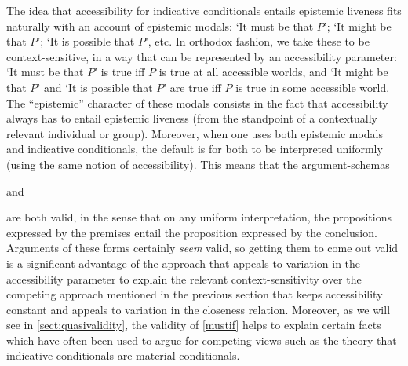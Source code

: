 \documentclass[If.tex]{subfiles}
\begin{document}
The idea that accessibility for indicative conditionals entails epistemic liveness fits naturally with an account of epistemic modals: ‘It must be that $P$’; ‘It might be that $P$’; ‘It is possible that $P$’, etc. In orthodox fashion, we take these to be context-sensitive, in a way that can be represented by an accessibility parameter: ‘It must be that $P$’ is true iff $P$ is true at all accessible worlds, and ‘It might be that $P$’ and ‘It is possible that $P$’ are true iff $P$ is true in some accessible world. The “epistemic” character of these modals consists in the fact that accessibility always has to entail epistemic liveness (from the standpoint of a contextually relevant individual or group).  Moreover, when one uses both epistemic modals and indicative conditionals, the default is for both to be interpreted uniformly (using the same notion of accessibility).  This means that the argument-schemas
\begin{prop}
	\litem[Must-if] \label{mustif}
\end{prop}
and 
\begin{prop} \label{mightpres}
\end{prop}
are both valid, in the sense that on any uniform interpretation, the propositions expressed by the premises entail the proposition expressed by the conclusion.  Arguments of these forms certainly \emph{seem} valid, so getting them to come out valid is a significant advantage of the approach that appeals to variation in the accessibility parameter to explain the relevant context-sensitivity over the competing approach mentioned in the previous section that keeps accessibility constant and appeals to variation in the closeness relation.  Moreover, as we will see in \autoref{sect:quasivalidity}, the validity of \ref{mustif} helps to explain certain facts which have often been used to argue for competing views such as the theory that indicative conditionals are material conditionals.

\end{document}
